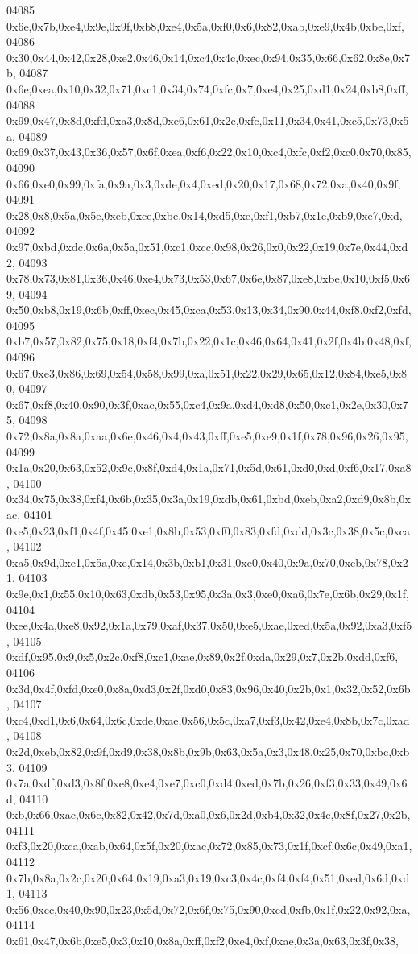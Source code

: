 \begin{DoxyCode}
04085   0x6e,0x7b,0xe4,0x9e,0x9f,0xb8,0xe4,0x5a,0xf0,0x6,0x82,0xab,0xe9,0x4b,0xbe,0xf,
04086   0x30,0x44,0x42,0x28,0xe2,0x46,0x14,0xc4,0x4c,0xec,0x94,0x35,0x66,0x62,0x8e,0x7b,
04087   0x6e,0xea,0x10,0x32,0x71,0xc1,0x34,0x74,0xfc,0x7,0xe4,0x25,0xd1,0x24,0xb8,0xff,
04088   0x99,0x47,0x8d,0xfd,0xa3,0x8d,0xe6,0x61,0x2c,0xfc,0x11,0x34,0x41,0xc5,0x73,0x5a,
04089   0x69,0x37,0x43,0x36,0x57,0x6f,0xea,0xf6,0x22,0x10,0xc4,0xfc,0xf2,0xc0,0x70,0x85,
04090   0x66,0xe0,0x99,0xfa,0x9a,0x3,0xde,0x4,0xed,0x20,0x17,0x68,0x72,0xa,0x40,0x9f,
04091   0x28,0x8,0x5a,0x5e,0xeb,0xce,0xbe,0x14,0xd5,0xe,0xf1,0xb7,0x1e,0xb9,0xe7,0xd,
04092   0x97,0xbd,0xdc,0x6a,0x5a,0x51,0xc1,0xcc,0x98,0x26,0x0,0x22,0x19,0x7e,0x44,0xd2,
04093   0x78,0x73,0x81,0x36,0x46,0xe4,0x73,0x53,0x67,0x6e,0x87,0xe8,0xbe,0x10,0xf5,0x69,
04094   0x50,0xb8,0x19,0x6b,0xff,0xec,0x45,0xca,0x53,0x13,0x34,0x90,0x44,0xf8,0xf2,0xfd,
04095   0xb7,0x57,0x82,0x75,0x18,0xf4,0x7b,0x22,0x1c,0x46,0x64,0x41,0x2f,0x4b,0x48,0xf,
04096   0x67,0xe3,0x86,0x69,0x54,0x58,0x99,0xa,0x51,0x22,0x29,0x65,0x12,0x84,0xe5,0x80,
04097   0x67,0xf8,0x40,0x90,0x3f,0xac,0x55,0xc4,0x9a,0xd4,0xd8,0x50,0xc1,0x2e,0x30,0x75,
04098   0x72,0x8a,0x8a,0xaa,0x6e,0x46,0x4,0x43,0xff,0xe5,0xe9,0x1f,0x78,0x96,0x26,0x95,
04099   0x1a,0x20,0x63,0x52,0x9c,0x8f,0xd4,0x1a,0x71,0x5d,0x61,0xd0,0xd,0xf6,0x17,0xa8,
04100   0x34,0x75,0x38,0xf4,0x6b,0x35,0x3a,0x19,0xdb,0x61,0xbd,0xeb,0xa2,0xd9,0x8b,0xac,
04101   0xe5,0x23,0xf1,0x4f,0x45,0xe1,0x8b,0x53,0xf0,0x83,0xfd,0xdd,0x3c,0x38,0x5c,0xca,
04102   0xa5,0x9d,0xe1,0x5a,0xe,0x14,0x3b,0xb1,0x31,0xe0,0x40,0x9a,0x70,0xcb,0x78,0x21,
04103   0x9e,0x1,0x55,0x10,0x63,0xdb,0x53,0x95,0x3a,0x3,0xe0,0xa6,0x7e,0x6b,0x29,0x1f,
04104   0xee,0x4a,0xe8,0x92,0x1a,0x79,0xaf,0x37,0x50,0xe5,0xae,0xed,0x5a,0x92,0xa3,0xf5,
04105   0xdf,0x95,0x9,0x5,0x2c,0xf8,0xc1,0xae,0x89,0x2f,0xda,0x29,0x7,0x2b,0xdd,0xf6,
04106   0x3d,0x4f,0xfd,0xe0,0x8a,0xd3,0x2f,0xd0,0x83,0x96,0x40,0x2b,0x1,0x32,0x52,0x6b,
04107   0xc4,0xd1,0x6,0x64,0x6c,0xde,0xae,0x56,0x5c,0xa7,0xf3,0x42,0xe4,0x8b,0x7c,0xad,
04108   0x2d,0xeb,0x82,0x9f,0xd9,0x38,0x8b,0x9b,0x63,0x5a,0x3,0x48,0x25,0x70,0xbc,0xb3,
04109   0x7a,0xdf,0xd3,0x8f,0xe8,0xe4,0xe7,0xc0,0xd4,0xed,0x7b,0x26,0xf3,0x33,0x49,0x6d,
04110   0xb,0x66,0xac,0x6c,0x82,0x42,0x7d,0xa0,0x6,0x2d,0xb4,0x32,0x4c,0x8f,0x27,0x2b,
04111   0xf3,0x20,0xca,0xab,0x64,0x5f,0x20,0xac,0x72,0x85,0x73,0x1f,0xcf,0x6c,0x49,0xa1,
04112   0x7b,0x8a,0x2c,0x20,0x64,0x19,0xa3,0x19,0xc3,0x4c,0xf4,0xf4,0x51,0xed,0x6d,0xd1,
04113   0x56,0xcc,0x40,0x90,0x23,0x5d,0x72,0x6f,0x75,0x90,0xcd,0xfb,0x1f,0x22,0x92,0xa,
04114   0x61,0x47,0x6b,0xe5,0x3,0x10,0x8a,0xff,0xf2,0xe4,0xf,0xae,0x3a,0x63,0x3f,0x38,

\end{DoxyCode}
